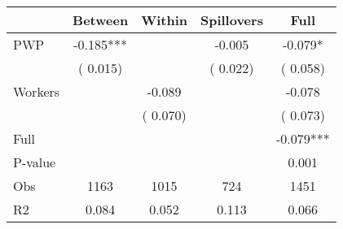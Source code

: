 
\begin{tabular}{l*{4}{c}}\hline&\multicolumn{1}{c}{Between}&\multicolumn{1}{c}{Within}&\multicolumn{1}{c}{Spillovers}&\multicolumn{1}{c}{Full}\\ \hline
 PWP           &             -0.185***      &                                               &       -0.005 &        -0.079*                            \\ 
                               &        (       0.015)           &                                       &       (       0.022)     &      (       0.058)                                           \\ 
 Workers       &                                               &       -0.089    &                                &            -0.078                            \\ 
                               &                                               & (       0.070)                  &                                        &      (       0.073)                                           \\ 
\hline                                                                                                                                                                                                                                            
 Full                  &                                               &                                               &                                        &            -0.079***                                     \\ 
 P-value               &                                               &                                               &                                        &             0.001                                           \\ 
 Obs                   &               1163               &       1015                       &       724                &              1451                                               \\ 
 R2                    &                      0.084              &              0.052                      &              0.113               &                     0.066                                              \\ 
\hline \end{tabular}                                                                                                                                                                                                              